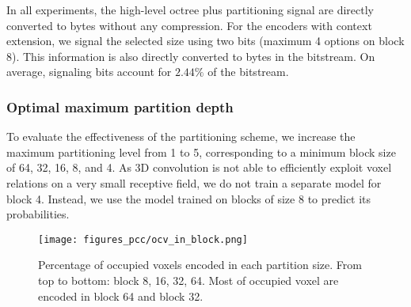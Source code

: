 In all experiments, the high-level octree plus partitioning signal are directly converted to bytes without any compression. For the encoders with context extension, we signal the selected size using two bits (maximum 4 options on block 8). This information is also directly converted to bytes in the bitstream. On average, signaling bits account for $2.44\%$ of the bitstream.







\subsubsection{Optimal maximum partition depth} 
To evaluate the effectiveness of the partitioning scheme, we increase the maximum partitioning level from 1 to 5, corresponding to a minimum block size of  64, 32, 16, 8, and 4. 
As 3D convolution is not able to efficiently exploit voxel relations on a very small receptive field, we do not train a  separate model for block 4.  Instead, we use the model trained on blocks of size 8 to predict its probabilities. 

\begin{figure*}[tb]
\captionsetup{justification=raggedright}
\centering
\texttt{[image: figures\_pcc/ocv\_in\_block.png]}
\vspace{0.1cm}
\caption{Percentage of occupied voxels encoded in each partition size. From top to bottom: block 8, 16, 32, 64. Most of occupied voxel are encoded in block 64 and block 32. }
\label{fig:ocv_per_block}
\end{figure*}
\setlength{\textfloatsep}{20pt}

